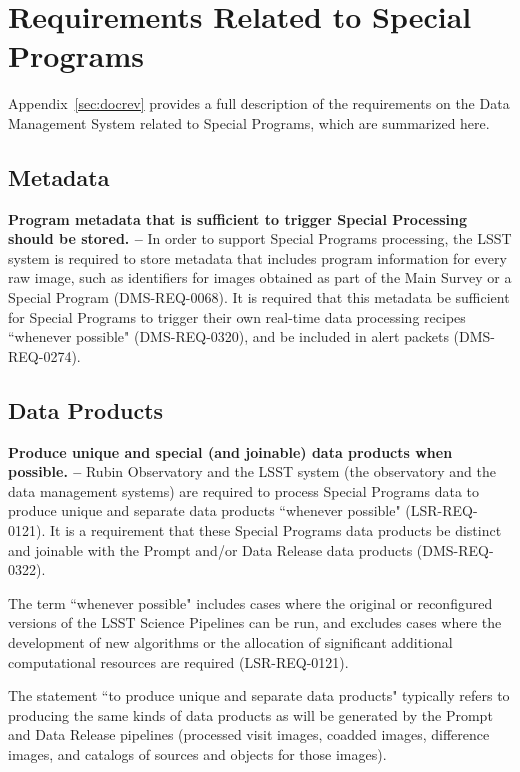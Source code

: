 \section{Requirements Related to Special Programs}\label{sec:req}

Appendix~\ref{sec:docrev} provides a full description of the requirements 
on the Data Management System related to Special Programs, which are summarized here.

\subsection{Metadata}\label{ssec:req_meta}

\textbf{Program metadata that is sufficient to trigger Special Processing should be stored. -- }
In order to support Special Programs processing, the LSST system is 
required to store metadata that includes program information for every raw 
image, such as identifiers for images obtained as part of the Main Survey 
or a Special Program (DMS-REQ-0068).
It is required that this metadata be sufficient for Special Programs to 
trigger their own real-time data processing recipes ``whenever possible" 
(DMS-REQ-0320), and be included in alert packets (DMS-REQ-0274).

\subsection{Data Products}\label{ssec:req_dp}

\textbf{Produce unique and special (and joinable) data products when possible. --}
Rubin Observatory and the LSST system (the observatory and the data 
management systems) are required to process Special Programs data to 
produce unique and separate data products ``whenever possible" 
(LSR-REQ-0121).
It is a requirement that these Special Programs data products be distinct 
and joinable with the Prompt and/or Data Release data products (DMS-REQ-0322).

The term ``whenever possible" includes cases where the original or 
reconfigured versions of the LSST Science Pipelines can be run, and 
excludes cases where the development of new algorithms or the allocation 
of significant additional computational resources are required 
(LSR-REQ-0121).

The statement ``to produce unique and separate data products" typically 
refers to producing the same kinds of data products as will be generated 
by the Prompt and Data Release pipelines (processed visit images, coadded 
images, difference images, and catalogs of sources and objects for those 
images).

